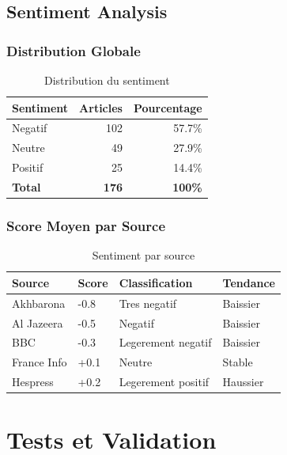\documentclass[12pt,a4paper]{report}
\begin{document}
\section{Sentiment Analysis}

\subsection{Distribution Globale}

\begin{table}[H]
\centering
\begin{tabular}{lrr}
\toprule
\textbf{Sentiment} & \textbf{Articles} & \textbf{Pourcentage} \\
\midrule
Negatif & 102 & 57.7\% \\
Neutre & 49 & 27.9\% \\
Positif & 25 & 14.4\% \\
\midrule
\textbf{Total} & \textbf{176} & \textbf{100\%} \\
\bottomrule
\end{tabular}
\caption{Distribution du sentiment}
\end{table}

\subsection{Score Moyen par Source}

\begin{table}[H]
\centering
\begin{tabular}{llll}
\toprule
\textbf{Source} & \textbf{Score} & \textbf{Classification} & \textbf{Tendance} \\
\midrule
Akhbarona & -0.8 & Tres negatif & Baissier \\
Al Jazeera & -0.5 & Negatif & Baissier \\
BBC & -0.3 & Legerement negatif & Baissier \\
France Info & +0.1 & Neutre & Stable \\
Hespress & +0.2 & Legerement positif & Haussier \\
\bottomrule
\end{tabular}
\caption{Sentiment par source}
\end{table}


\chapter{Tests et Validation}
\end{document}
